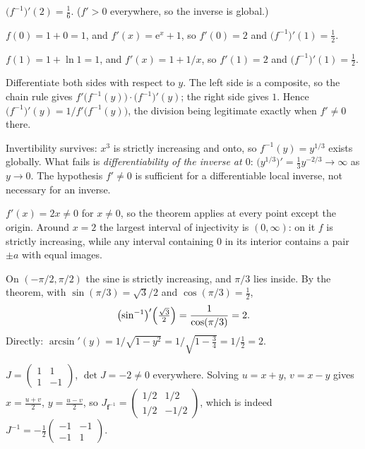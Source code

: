 \begin{solutions}
        $\bigl(f^{-1}\bigr)'(2)=\tfrac16$. ($f'>0$ everywhere, so the
        inverse is global.)
  \item $f(0)=1+0=1$, and $f'(x)=\mathrm{e}^{x}+1$, so $f'(0)=2$ and
        $\bigl(f^{-1}\bigr)'(1)=\tfrac12$.
  \item $f(1)=1+\ln1=1$, and $f'(x)=1+1/x$, so $f'(1)=2$ and
        $\bigl(f^{-1}\bigr)'(1)=\tfrac12$.
  \item Differentiate both sides with respect to $y$. The left side is a
        composite, so the chain rule gives
        $f'\bigl(f^{-1}(y)\bigr)\cdot\bigl(f^{-1}\bigr)'(y)$; the right side
        gives $1$. Hence
        $\bigl(f^{-1}\bigr)'(y)=1/f'\bigl(f^{-1}(y)\bigr)$, the division
        being legitimate exactly when $f'\neq0$ there.
  \item Invertibility survives: $x^{3}$ is strictly increasing and onto, so
        $f^{-1}(y)=y^{1/3}$ exists globally. What fails is
        \emph{differentiability of the inverse at $0$}:
        $\bigl(y^{1/3}\bigr)'=\tfrac13y^{-2/3}\to\infty$ as $y\to0$. The
        hypothesis $f'\neq0$ is sufficient for a differentiable local
        inverse, not necessary for an inverse.
  \item $f'(x)=2x\neq0$ for $x\neq0$, so the theorem applies at every point
        except the origin. Around $x=2$ the largest interval of
        injectivity is $(0,\infty)$: on it $f$ is strictly increasing, while
        any interval containing $0$ in its interior contains a pair
        $\pm a$ with equal images.
  \item On $(-\pi/2,\pi/2)$ the sine is strictly increasing, and
        $\pi/3$ lies inside. By the theorem, with
        $\sin(\pi/3)=\sqrt3/2$ and $\cos(\pi/3)=\tfrac12$,
        \[
          \bigl(\sin^{-1}\bigr)'\Bigl(\tfrac{\sqrt3}{2}\Bigr)
          =\frac{1}{\cos(\pi/3)}=2 .
        \]
        Directly: $\arcsin'(y)=1/\sqrt{1-y^{2}}
        =1/\sqrt{1-\tfrac34}=1/\tfrac12=2$. \checkmark
  \item $J=\begin{pmatrix}1&1\\1&-1\end{pmatrix}$, $\det J=-2\neq0$
        everywhere. Solving $u=x+y$, $v=x-y$ gives
        $x=\tfrac{u+v}{2}$, $y=\tfrac{u-v}{2}$, so
        $J_{\mathbf{f}^{-1}}
        =\begin{pmatrix}1/2&1/2\\1/2&-1/2\end{pmatrix}$, which is indeed
        $J^{-1}=-\tfrac12\begin{pmatrix}-1&-1\\-1&1\end{pmatrix}$.

\end{solutions}
